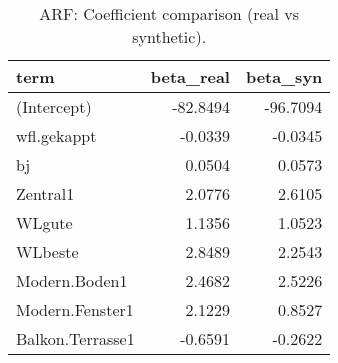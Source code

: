 \begin{table}[ht]
\centering
\begin{tabular}{lrr}
  \hline
term & beta\_real & beta\_syn \\ 
  \hline
(Intercept) & -82.8494 & -96.7094 \\ 
  wfl.gekappt & -0.0339 & -0.0345 \\ 
  bj & 0.0504 & 0.0573 \\ 
  Zentral1 & 2.0776 & 2.6105 \\ 
  WLgute & 1.1356 & 1.0523 \\ 
  WLbeste & 2.8489 & 2.2543 \\ 
  Modern.Boden1 & 2.4682 & 2.5226 \\ 
  Modern.Fenster1 & 2.1229 & 0.8527 \\ 
  Balkon.Terrasse1 & -0.6591 & -0.2622 \\ 
   \hline
\end{tabular}
\caption{ARF: Coefficient comparison (real vs synthetic).} 
\label{tab:arf:coef}
\end{table}
